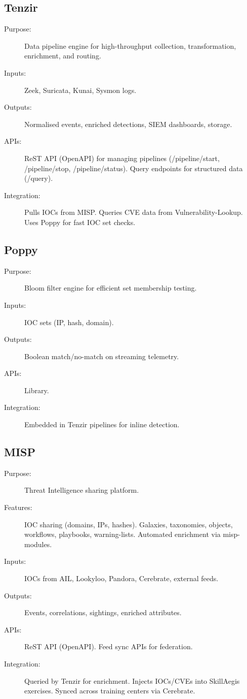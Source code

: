 \documentclass[10pt,a4paper]{report}
\begin{document}
\subsection{Tenzir}
\begin{description}
  \item[Purpose:] Data pipeline engine for high-throughput collection,
  transformation, enrichment, and routing.
  \item[Inputs:] Zeek, Suricata, Kunai, Sysmon logs.
  \item[Outputs:] Normalised events, enriched detections, SIEM dashboards,
  storage.
  \item[APIs:] ReST API (OpenAPI) for managing pipelines
  (/pipeline/start, /pipeline/stop, /pipeline/status). Query endpoints for
  structured data (/query).
  \item[Integration:] Pulls IOCs from MISP. Queries CVE data from
  Vulnerability-Lookup. Uses Poppy for fast IOC set checks.
\end{description}

\subsection{Poppy}
\begin{description}
  \item[Purpose:] Bloom filter engine for efficient set membership testing.
  \item[Inputs:] IOC sets (IP, hash, domain).
  \item[Outputs:] Boolean match/no-match on streaming telemetry.
  \item[APIs:] Library.
  \item[Integration:] Embedded in Tenzir pipelines for inline detection.
\end{description}

\subsection{MISP}
\begin{description}
  \item[Purpose:] Threat Intelligence sharing platform.
  \item[Features:] IOC sharing (domains, IPs, hashes). Galaxies, taxonomies,
  objects, workflows, playbooks, warning-lists. Automated enrichment via
  misp-modules.
  \item[Inputs:] IOCs from AIL, Lookyloo, Pandora, Cerebrate, external feeds.
  \item[Outputs:] Events, correlations, sightings, enriched attributes.
  \item[APIs:] ReST API (OpenAPI). Feed sync APIs for federation.
  \item[Integration:] Queried by Tenzir for enrichment. Injects IOCs/CVEs
  into SkillAegis exercises. Synced across training centers via Cerebrate.
\end{description}
\end{document}
